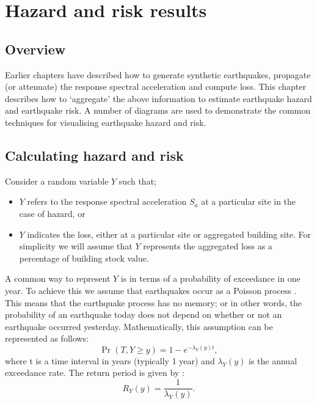 \chapter{Hazard and risk results}
\label{ch:risk}


\section{Overview}

Earlier chapters have described how to generate synthetic
earthquakes, propagate (or attenuate) the response spectral
acceleration and compute
loss. This chapter describes how to `aggregate' the above
information to estimate earthquake hazard and earthquake risk. A
number of diagrams are used to demonstrate the common techniques
for visualising earthquake hazard and risk.

\section{Calculating hazard and risk}

Consider a random variable $Y$ such that; \begin{itemize} 

\item
$Y$ refers to the response spectral acceleration $S_a$ at a particular site in the case of
hazard, or 
\item $Y$ indicates the loss, either at a particular site or
  aggregated building site.  For simplicity we will assume that $Y$
  represents the aggregated loss as a percentage of building stock
  value.
\end{itemize}

A common way to represent $Y$ is in terms of a probability of
exceedance in one year. To achieve this we assume that
earthquakes occur as a Poisson process \citep{dr_McGuire90a}. This
means that the earthquake process has no memory; or in other
words, the probability of an earthquake today does not depend on
whether or not an earthquake occurred yesterday. Mathematically,
this assumption can be represented as follows:
\begin{equation}
 \Pr(T, Y\ge y) = 1 - e^{-\lambda_Y(y)t},
\end{equation}
where t is a time interval in years (typically 1 year) and
$\lambda_Y(y)$ is the annual exceedance rate. The return period is
given by :
\begin{equation}
\label{eq:risk-rptolambda} R_Y(y) = \frac{1}{\lambda_Y(y)}.
\end{equation}

